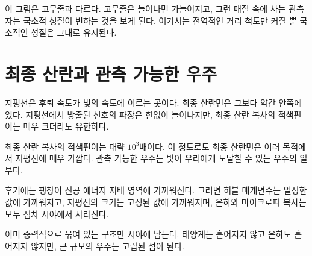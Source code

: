 \begin{classroomqa}
\end{classroomqa}

이 그림은 고무줄과 다르다. 고무줄은 늘어나면 가늘어지고, 그런 매질 속에 사는 관측자는 국소적 성질이 변하는 것을 보게 된다. 여기서는 전역적인 거리 척도만 커질 뿐 국소적인 성질은 그대로 유지된다.

\section{최종 산란과 관측 가능한 우주}

지평선은 후퇴 속도가 빛의 속도에 이르는 곳이다. 최종 산란면은 그보다 약간 안쪽에 있다. 지평선에서 방출된 신호의 파장은 한없이 늘어나지만, 최종 산란 복사의 적색편이는 매우 크더라도 유한하다.

\begin{classroomqa}
\end{classroomqa}

최종 산란 복사의 적색편이는 대략 \(10^3\)배이다. 이 정도로도 최종 산란면은 여러 목적에서 지평선에 매우 가깝다. 관측 가능한 우주는 빛이 우리에게 도달할 수 있는 우주의 일부다.

후기에는 팽창이 진공 에너지 지배 영역에 가까워진다. 그러면 허블 매개변수는 일정한 값에 가까워지고, 지평선의 크기는 고정된 값에 가까워지며, 은하와 마이크로파 복사는 모두 점차 시야에서 사라진다.

\begin{classroomqa}
\end{classroomqa}

이미 중력적으로 묶여 있는 구조만 시야에 남는다. 태양계는 흩어지지 않고 은하도 흩어지지 않지만, 큰 규모의 우주는 고립된 섬이 된다.

